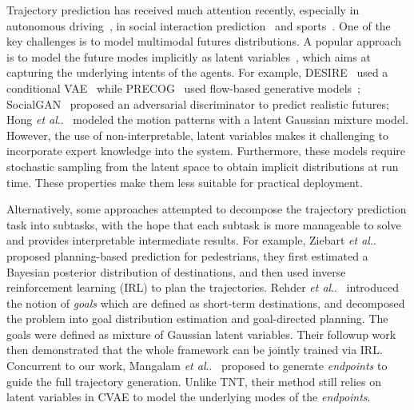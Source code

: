 \documentclass{article}
\makeatletter
\DeclareRobustCommand\onedot{\futurelet\@let@token\@onedot}
\def\@onedot{\ifx\@let@token.\else.\null\fi\xspace}
\newcommand{\model}{TNT\xspace}
\def\etal{\emph{et al}\onedot}
\makeatother
\begin{document}
Trajectory prediction has received much attention recently, especially in autonomous driving~\cite{chang2019argoverse,interactiondataset,highDdataset,NGSIM,fang2020tpnet}, in social interaction prediction~\cite{Kitani2017Activity,SocialLSTM,helbing1995social,ma2017forecasting} and sports~\cite{zheng2016generating,ZhanBasketball}. One of the key challenges is to model multimodal futures distributions. A popular approach is to model the future modes implicitly as latent variables~\cite{DESIRE,precog_Rhinehart_2019_ICCV,SocialGAN,cui2019multimodal,hong2019rules,Yeh_2019_CVPR,sun2019stochastic,tang_multifuture}, which aims at capturing the underlying intents of the agents. For example, DESIRE~\cite{DESIRE} used a conditional VAE~\cite{kingma2013auto} while PRECOG~\cite{precog_Rhinehart_2019_ICCV} used flow-based generative models~\cite{rezende2015variational}; SocialGAN~\cite{SocialGAN} proposed an adversarial discriminator to predict realistic futures; Hong \etal~\cite{hong2019rules} modeled the motion patterns with a latent Gaussian mixture model. However, the use of non-interpretable, latent variables makes it challenging to incorporate expert knowledge into the system. Furthermore, these models require stochastic sampling from the latent space to obtain implicit distributions at run time.  These properties make them less suitable for practical deployment.

Alternatively, some approaches attempted to decompose the trajectory prediction task into subtasks, with the hope that each subtask is more manageable to solve and provides interpretable intermediate results. For example, Ziebart \etal~\cite{ziebart2009planning} proposed planning-based prediction for pedestrians, they first estimated a Bayesian posterior distribution of destinations, and then used inverse reinforcement learning (IRL) to plan the trajectories. Rehder \etal~\cite{rehder2015goal} introduced the notion of \textit{goals} which are defined as short-term destinations, and decomposed the problem into goal distribution estimation and goal-directed planning. The goals were defined as mixture of Gaussian latent variables. Their followup work~\cite{rehder2018pedestrian} then demonstrated that the whole framework can be jointly trained via IRL.
Concurrent to our work, Mangalam \etal~\cite{mangalam2020not} proposed to generate \textit{endpoints} to guide the full trajectory generation. Unlike \model, their method still relies on latent variables in CVAE to model the underlying modes of the \textit{endpoints}.
\end{document}
